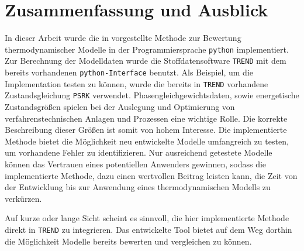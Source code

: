 \documentclass[../thesis.tex]{subfiles}
\begin{document}
\chapter{Zusammenfassung und Ausblick}

In dieser Arbeit wurde die in \cite{jaubert2020benchmark} vorgestellte Methode zur Bewertung thermodynamischer Modelle in der Programmiersprache \texttt{python} implementiert. Zur Berechnung der Modelldaten wurde die Stoffdatensoftware \texttt{TREND} mit dem bereits vorhandenen \texttt{python-Interface} benutzt. Als Beispiel, um die Implementation testen zu können, wurde die bereits in \texttt{TREND} vorhandene Zustandsgleichung \texttt{PSRK} verwendet.
Phasengleichgewichtsdaten, sowie energetische Zustandsgrößen spielen bei der Auslegung und Optimierung von verfahrenstechnischen Anlagen und Prozessen eine wichtige Rolle. Die korrekte Beschreibung dieser Größen ist somit von hohem Interesse. Die implementierte Methode bietet die Möglichkeit neu entwickelte Modelle umfangreich zu testen, um vorhandene Fehler zu identifizieren. Nur ausreichend getestete Modelle können das Vertrauen eines potentiellen Anwenders gewinnen, sodass die implementierte Methode, dazu einen wertvollen Beitrag leisten kann, die Zeit von der Entwicklung bis zur Anwendung eines thermodynamischen Modells zu verkürzen.

Auf kurze oder lange Sicht scheint es sinnvoll, die hier implementierte Methode direkt in \texttt{TREND} zu integrieren. Das entwickelte Tool bietet auf dem Weg dorthin die Möglichkeit Modelle bereits bewerten und vergleichen zu können.
\end{document}
